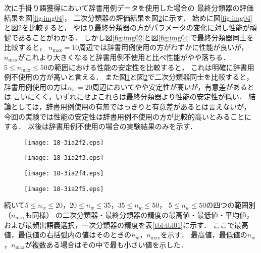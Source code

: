 \documentclass[japanese]{jnlp_1.4}
\begin{document}
次に手掛り語獲得において辞書用例データを使用した場合の
最終分類器の評価結果を図\ref{fig:img04}，
二次分類器の評価結果を図\ref{fig:img05}に示す．
始めに図\ref{fig:img04}と図\ref{fig:img05}を比較すると，
やはり最終分類器の方がパラメータの変化に対し性能が頑健であることがわかる．
しかし図\ref{fig:img02}と図\ref{fig:img04}で最終分類器同士を比較すると，
$n_{\max} = 10$周辺では辞書用例使用の方がわずかに性能が良いが，
$n_{\max}$がこれより大きくなると辞書用例不使用と比べ性能がやや落ちる．
$5 \leq n_{\max} \leq 50$の範囲における性能の安定性を比較すると，
これは明確に辞書用例不使用の方が高いと言える．
また図\ref{fig:img03}と図\ref{fig:img05}で二次分類器同士を比較すると，
辞書用例使用の方は$n_w = 20$周辺においてやや安定性が高いが，有意差があるとは
言いにくく，いずれにせよこれらは最終分類器より性能の安定性が低い．
結論としては，辞書用例使用の有無ではっきりと有意差があるとは言えないが，
今回の実験では性能の安定性は辞書用例不使用の方が比較的高いとみることにする．
以後は辞書用例不使用の場合の実験結果のみを示す．

\begin{figure}[t]
\setlength{\captionwidth}{202pt}
\begin{minipage}[t]{202pt}
  \texttt{[image: 18-3ia2f2.eps]}
  \label{fig:img02}
  \end{minipage}
\hfill
  \begin{minipage}[t]{202pt}
  \texttt{[image: 18-3ia2f3.eps]}
  \label{fig:img03}
  \end{minipage} 
\vspace{1\baselineskip}
\end{figure}
\begin{figure}[t]
\setlength{\captionwidth}{202pt}
\begin{minipage}[t]{202pt}
  \texttt{[image: 18-3ia2f4.eps]}
  \label{fig:img04}
 \end{minipage}
\hfill
 \begin{minipage}[t]{202pt}
  \texttt{[image: 18-3ia2f5.eps]}
  \label{fig:img05}
  \end{minipage}
\end{figure}

続いて$5 \leq n_w \leq 20$，$20 \leq n_w \leq 35$，$35 \leq n_w \leq 50$，
$5 \leq n_w \leq 50$の四つの範囲別（$n_{\max}$も同様）
の二次分類器・最終分類器の精度の最高値・最低値・平均値，
および最頻出語義選択，一次分類器の精度を表\ref{tbl:tbl01}に示す．
ここで最高値，最低値の右括弧内の値はそのときの$n_w$，$n_{\max}$を示す．
最高値，最低値の$n_w$，$n_{\max}$が複数ある場合はその中で最も小さい値を示した．
\end{document}
